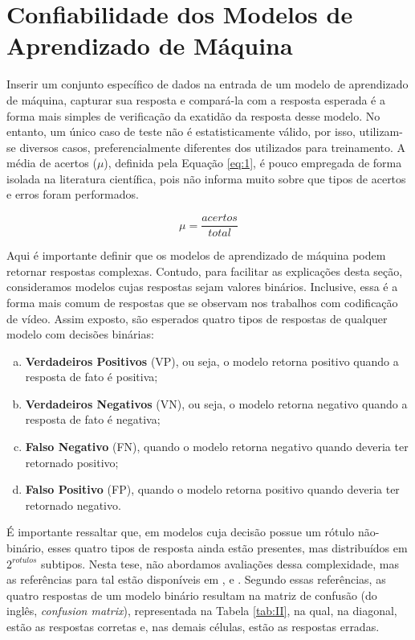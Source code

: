\section{Confiabilidade dos Modelos de Aprendizado de Máquina}
\label{cap:2.4}

Inserir um conjunto específico de dados na entrada de um modelo de aprendizado de máquina, capturar sua resposta e compará-la com a resposta esperada é a forma mais simples de verificação da exatidão da resposta desse modelo. No entanto, um único caso de teste não é estatisticamente válido, por isso, utilizam-se diversos casos, preferencialmente diferentes dos utilizados para treinamento. A média de acertos ($\mu$), definida pela Equação \ref{eq:1}, é pouco empregada de forma isolada na literatura científica, pois não informa muito sobre que tipos de acertos e erros foram performados.

\begin{equation}
    \label{eq:1}
    \mu = \frac{acertos}{total}
\end{equation}

Aqui é importante definir que os modelos de aprendizado de máquina podem retornar respostas complexas. Contudo, para facilitar as explicações desta seção, consideramos modelos cujas respostas sejam valores binários. Inclusive, essa é a forma mais comum de respostas que se observam nos trabalhos com codificação de vídeo. Assim exposto, são esperados quatro tipos de respostas de qualquer modelo com decisões binárias: 

\begin{enumerate}[a)]
    \item \textbf{Verdadeiros Positivos} (VP), ou seja, o modelo retorna positivo quando a resposta de fato é positiva;
    
    \item \textbf{Verdadeiros Negativos} (VN), ou seja, o modelo retorna negativo quando a resposta de fato é negativa;
    
    \item \textbf{Falso Negativo} (FN), quando o modelo retorna negativo quando deveria ter retornado positivo;
    
    \item \textbf{Falso Positivo} (FP), quando o modelo retorna positivo quando deveria ter retornado negativo.
\end{enumerate}

É importante ressaltar que, em modelos cuja decisão possue um rótulo não-binário, esses quatro tipos de resposta ainda estão presentes, mas distribuídos em $2^{rotulos}$ subtipos. Nesta tese, não abordamos avaliações dessa complexidade, mas as referências para tal estão disponíveis em \citet{bib:livroKubat}, \citet{bib:livroML} e \citet{bib:livroRaschka}. Segundo essas referências, as quatro respostas de um modelo binário resultam na matriz de confusão (do inglês, \textit{confusion matrix}), representada na Tabela \ref{tab:II}, na qual, na diagonal, estão as respostas corretas e, nas demais células, estão as respostas erradas.

